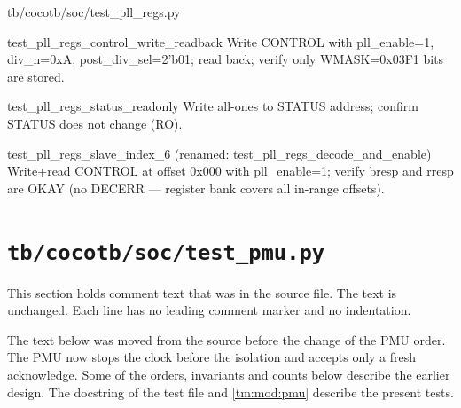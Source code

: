\begin{relocated}{tb/cocotb/soc/test_pll_regs.py}
\begin{textblock}
test_pll_regs_control_write_readback
Write CONTROL with pll_enable=1, div_n=0xA, post_div_sel=2'b01;
read back; verify only WMASK=0x03F1 bits are stored.

test_pll_regs_status_readonly
Write all-ones to STATUS address; confirm STATUS does not change (RO).

test_pll_regs_slave_index_6 (renamed: test_pll_regs_decode_and_enable)
Write+read CONTROL at offset 0x000 with pll_enable=1;
verify bresp and rresp are OKAY (no DECERR — register bank covers all
in-range offsets).
\end{textblock}

\end{relocated}

\section{\texttt{tb/cocotb/soc/test\_pmu.py}}\label{tm:suite:soc-test-pmu}

This section holds comment text that was in the source file. The text is unchanged. Each line has no leading comment marker and no indentation.

\begin{information}
The text below was moved from the source before the change of the PMU order. The PMU now stops the clock before the isolation and accepts only a fresh acknowledge. Some of the orders, invariants and counts below describe the earlier design. The docstring of the test file and \cref{tm:mod:pmu} describe the present tests.
\end{information}

